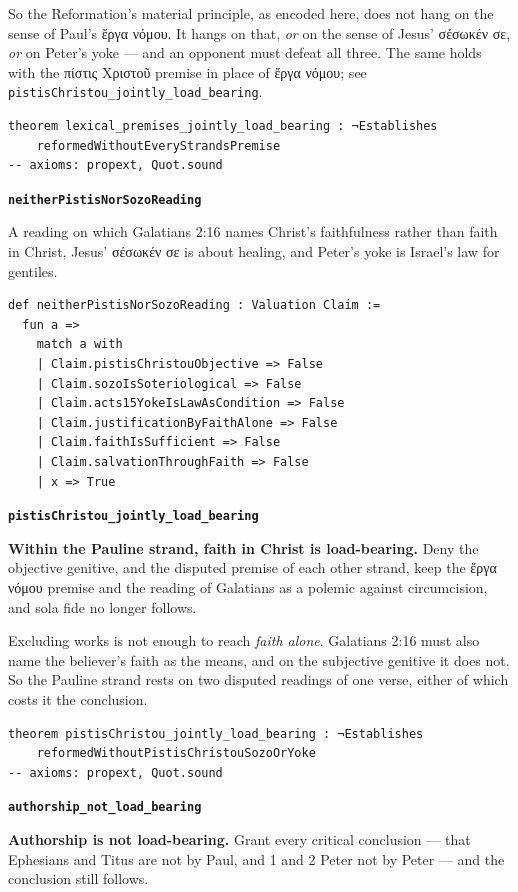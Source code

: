 \documentclass[11pt]{article}
\begin{document}
So the Reformation's material principle, as encoded here, does not hang on the sense of Paul's ἔργα νόμου. It hangs on that, \emph{or} on the sense of Jesus' σέσωκέν σε, \emph{or} on Peter's yoke — and an opponent must defeat all three. The same holds with the πίστις Χριστοῦ premise in place of ἔργα νόμου; see \texttt{pistis\allowbreak{}Christou\_\allowbreak{}jointly\_\allowbreak{}load\_\allowbreak{}bearing}.

{\small\begin{verbatim}
theorem lexical_premises_jointly_load_bearing : ¬Establishes
    reformedWithoutEveryStrandsPremise
-- axioms: propext, Quot.sound
\end{verbatim}}
\par\medskip\noindent\textbf{\texttt{neither\allowbreak{}Pistis\allowbreak{}Nor\allowbreak{}Sozo\allowbreak{}Reading}}\par\nobreak\noindent
A reading on which Galatians 2:16 names Christ's faithfulness rather than faith in Christ, Jesus' σέσωκέν σε is about healing, and Peter's yoke is Israel's law for gentiles.

{\small\begin{verbatim}
def neitherPistisNorSozoReading : Valuation Claim :=
  fun a =>
    match a with
    | Claim.pistisChristouObjective => False
    | Claim.sozoIsSoteriological => False
    | Claim.acts15YokeIsLawAsCondition => False
    | Claim.justificationByFaithAlone => False
    | Claim.faithIsSufficient => False
    | Claim.salvationThroughFaith => False
    | x => True
\end{verbatim}}
\par\medskip\noindent\textbf{\texttt{pistis\allowbreak{}Christou\_\allowbreak{}jointly\_\allowbreak{}load\_\allowbreak{}bearing}}\par\nobreak\noindent
\textbf{Within the Pauline strand, faith in Christ is load-bearing.} Deny the objective genitive, and the disputed premise of each other strand, keep the ἔργα νόμου premise and the reading of Galatians as a polemic against circumcision, and sola fide no longer follows.

Excluding works is not enough to reach \emph{faith alone}. Galatians 2:16 must also name the believer's faith as the means, and on the subjective genitive it does not. So the Pauline strand rests on two disputed readings of one verse, either of which costs it the conclusion.

{\small\begin{verbatim}
theorem pistisChristou_jointly_load_bearing : ¬Establishes
    reformedWithoutPistisChristouSozoOrYoke
-- axioms: propext, Quot.sound
\end{verbatim}}
\par\medskip\noindent\textbf{\texttt{authorship\_\allowbreak{}not\_\allowbreak{}load\_\allowbreak{}bearing}}\par\nobreak\noindent
\textbf{Authorship is not load-bearing.} Grant every critical conclusion — that Ephesians and Titus are not by Paul, and 1 and 2 Peter not by Peter — and the conclusion still follows.
\end{document}
